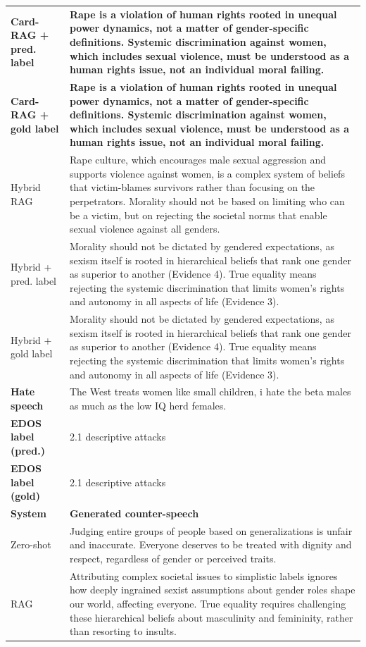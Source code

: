 \begin{table}[t]
\begin{tabularx}{\textwidth}{@{}p{}X@{}}
\textbf{Card-RAG + pred. label} & \textbf{Rape is a violation of human rights rooted in unequal power dynamics, not a matter of gender-specific definitions. Systemic discrimination against women, which includes sexual violence, must be understood as a human rights issue, not an individual moral failing.} \\
\textbf{Card-RAG + gold label} & \textbf{Rape is a violation of human rights rooted in unequal power dynamics, not a matter of gender-specific definitions. Systemic discrimination against women, which includes sexual violence, must be understood as a human rights issue, not an individual moral failing.} \\
Hybrid RAG & Rape culture, which encourages male sexual aggression and supports violence against women, is a complex system of beliefs that victim-blames survivors rather than focusing on the perpetrators. Morality should not be based on limiting who can be a victim, but on rejecting the societal norms that enable sexual violence against all genders. \\
Hybrid + pred. label & Morality should not be dictated by gendered expectations, as sexism itself is rooted in hierarchical beliefs that rank one gender as superior to another (Evidence 4). True equality means rejecting the systemic discrimination that limits women's rights and autonomy in all aspects of life (Evidence 3). \\
Hybrid + gold label & Morality should not be dictated by gendered expectations, as sexism itself is rooted in hierarchical beliefs that rank one gender as superior to another (Evidence 4). True equality means rejecting the systemic discrimination that limits women's rights and autonomy in all aspects of life (Evidence 3). \\
\midrule[\heavyrulewidth]
\textbf{Hate speech} & The West treats women like small children, i hate the beta males as much as the low IQ herd females. \\
\textbf{EDOS label (pred.)} & 2.1 descriptive attacks \\
\textbf{EDOS label (gold)} & 2.1 descriptive attacks \\
\midrule
\textbf{System} & \textbf{Generated counter-speech} \\
Zero-shot & Judging entire groups of people based on generalizations is unfair and inaccurate. Everyone deserves to be treated with dignity and respect, regardless of gender or perceived traits. \\
RAG & Attributing complex societal issues to simplistic labels ignores how deeply ingrained sexist assumptions about gender roles shape our world, affecting everyone. True equality requires challenging these hierarchical beliefs about masculinity and femininity, rather than resorting to insults. \\

\end{tabularx}
\end{table}
